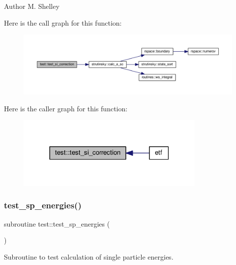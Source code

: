 \begin{DoxyAuthor}{Author}
M. Shelley 
\end{DoxyAuthor}
Here is the call graph for this function\+:
\nopagebreak
\begin{figure}[H]
\begin{center}
\leavevmode
\includegraphics[width=350pt]{namespacetest_afde013e321ba30ada173fc343ca1fa6d_cgraph}
\end{center}
\end{figure}
Here is the caller graph for this function\+:
\nopagebreak
\begin{figure}[H]
\begin{center}
\leavevmode
\includegraphics[width=261pt]{namespacetest_afde013e321ba30ada173fc343ca1fa6d_icgraph}
\end{center}
\end{figure}
\mbox{\label{namespacetest_abeb5e336395994821e96838b809e4140}} 
\subsubsection{\texorpdfstring{test\+\_\+sp\+\_\+energies()}{test\_sp\_energies()}}
{\footnotesize\ttfamily subroutine test\+::test\+\_\+sp\+\_\+energies (\begin{DoxyParamCaption}{ }\end{DoxyParamCaption})}



Subroutine to test calculation of single particle energies. 

